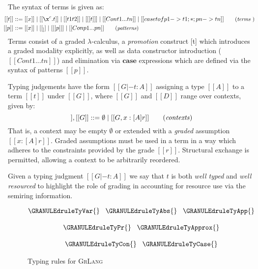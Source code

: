 The syntax of terms is given as:
%
\begin{align*}
\hspace{-0.8em} [[ t ]] ::= \;
       & [[ x ]]
  \mid [[ \x ^ c . t ]]
  \mid [[ t1 t2 ]]
  \mid [[ [t] ]]
  \mid [[ Con t1 ... tn ]]
  \mid [[ case t of p1 -> t1 ; * ; pn -> tn  ]]
{\small{\tag{\textit{terms} }}}
         \\
\hspace{-0.8em} [[ p ]] ::= \;
       & [[ x ]]
  \mid [[ _ ]]
  \mid [[ [p] ]]
  \mid [[ Con p1 ... pn ]]
{\small{\tag{\textit{patterns}}}}
\end{align*}
%
Terms consist of a graded $\lambda$-calculus, a \textit{promotion} construct [t] which introduces a graded modality explicitly, as well as data constructor introduction ($[[ Con t1 ... tn ]]$) and elimination via
 $\textbf{case}$ expressions which are defined via the syntax of patterns $[[ p ]]$.

Typing judgements have the form
$[[ G |- t : A ]]$ assigning a type $[[ A ]]$ to a term $ [[ t ]]$ under
$ [[ G ]]$, where $[[ G ]]$ and $[[ D ]]$ range over contexts, given by:
%
\begin{equation*}
  [[ D ]], [[ G ]] ::= \emptyset
  \mid [[ G , x : [ A ] r ]]
\tag{\textit{contexts}}
\end{equation*}
%
That is, a context may be empty $\emptyset$ or extended with a \textit{graded}
assumption $ [[ x : [A] r ]]$. Graded assumptions must be used in a term in a
way which adheres to the
constraints provided by the grade $[[ r ]]$. Structural exchange is permitted,
allowing a context to be arbitrarily reordered.

Given a typing judgment $[[ G |- t : A ]]$ we say that $t$ is both \emph{well typed}
and \emph{well resourced} to highlight the role of grading in accounting for resource
use via the semiring information.

\begin{figure}[t]
\hspace{-0.5em}
\begin{align*}
\hspace{-0.5em}
\begin{array}{c}
\GRANULEdruleTyVar{}
\;\;\;
\GRANULEdruleTyAbs{}
\;\;\;
\GRANULEdruleTyApp{}
\\\\
\GRANULEdruleTyPr{}
\;\;\;
\GRANULEdruleTyApprox{}
\\\\
\GRANULEdruleTyCon{}
\;\;\;
\GRANULEdruleTyCase{}
\end{array}
\end{align*}
\vspace{-0.5em}
\caption{Typing rules for \textsc{GrLang}}
\label{fig:typing}
\vspace{-0.5em}
 \end{figure}

